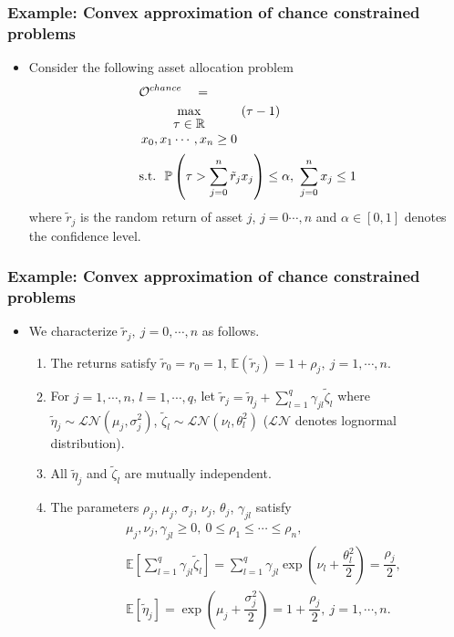 \documentclass{beamer}
\begin{document}
\begin{frame}
	\frametitle{Example: Convex approximation of chance constrained problems}
	\begin{itemize}
		\item Consider the following asset allocation problem
		\begin{align} \label{investment_problem}
		\begin{split}
		& \mathcal{O}^{chance}\quad=\\
		&\max_{\begin{matrix}
			\tau \in \mathbb{R}\\ 	
			x_0, x_1\cdots,x_n \geq 0
			\end{matrix}}\ (\tau - 1)\ \ \\ 
		& \textnormal{s.t.}\ \ \mathbb{P} \left(\tau > \sum_{j=0}^n \tilde r_j x_j \right) \leq \alpha,\ \sum_{j=0}^{n} x_j \leq 1
		\end{split}
		\end{align}
		where $\tilde{r}_j$ is the random return of asset $j$, $j=0\cdots,n$ and $\alpha \in [0,1]$ denotes the confidence level.
	\end{itemize}
\end{frame}

\begin{frame}
	\frametitle{Example: Convex approximation of chance constrained problems}
	\begin{itemize}
		\item We characterize $\tilde{r}_j,\ j=0,\cdots,n$ as follows.
		\begin{enumerate}
			\item The returns satisfy $\tilde r_0=r_0=1$, $\mathbb{E}(\tilde r_j) = 1 + \rho_j,\ j=1,\cdots,n$.
			
			\item For $j=1,\cdots,n$,  $l=1,\cdots,q$, let $\tilde r_j = \tilde\eta_j + \sum_{l=1}^q \gamma_{jl}\tilde\zeta_l$ where $\tilde\eta_j \sim \mathcal{LN}(\mu_j, \sigma_j^2)$, $\tilde\zeta_l \sim \mathcal{LN}(\nu_l, \theta_l^2)$ ($\mathcal{LN}$ denotes lognormal distribution).\\[1ex]
			
			\item All $\tilde\eta_j$ and $\tilde\zeta_l$ are mutually independent.
			
			\item The parameters $\rho_j$, $\mu_j$, $\sigma_j$, $\nu_j$, $\theta_j$, $\gamma_{jl}$ satisfy
			\begin{align*}
			&\mu_j, \nu_j, \gamma_{jl} \geq 0,\ 0\leq \rho_1 \leq \cdots \leq \rho_n,\\[1ex]
			&\mathbb{E}\left[\sum_{l=1}^q \gamma_{jl} \tilde\zeta_l\right] =  \sum_{l=1}^q \gamma_{jl} \exp \left(\nu_l + \dfrac{\theta_l^2}{2}\right) = \dfrac{\rho_j}{2},\\[1ex]
			&\mathbb{E}\left[\tilde\eta_j\right] = \exp\left(\mu_j + \dfrac{\sigma_j^2}{2}\right) = 1 + \dfrac{\rho_j}{2},\ j =1,\cdots, n.
			\end{align*}
		\end{enumerate}
	\end{itemize}
\end{frame}
\end{document}
